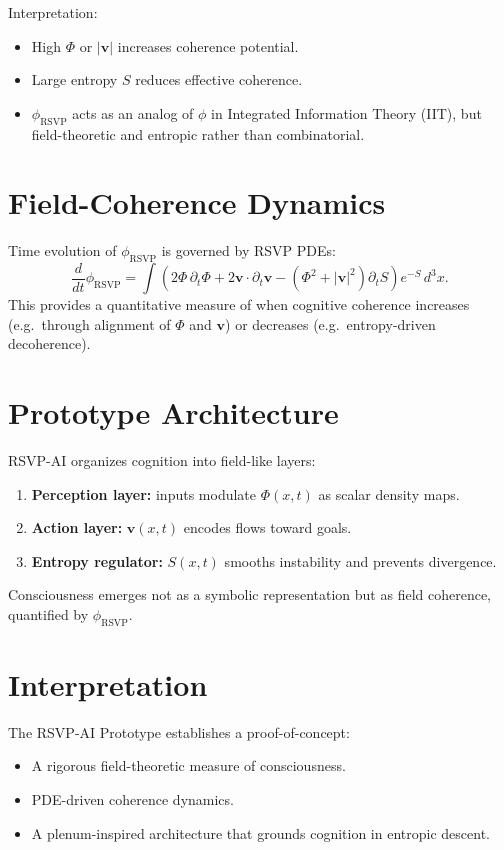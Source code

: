 \documentclass[12pt]{report}
\begin{document}
Interpretation:
\begin{itemize}
    \item High $\Phi$ or $|\mathbf{v}|$ increases coherence potential.  
    \item Large entropy $S$ reduces effective coherence.  
    \item $\phi_{\text{RSVP}}$ acts as an analog of $\phi$ in Integrated Information Theory (IIT), but field-theoretic and entropic rather than combinatorial.  
\end{itemize}

\section{Field-Coherence Dynamics}

Time evolution of $\phi_{\text{RSVP}}$ is governed by RSVP PDEs:
\[
\frac{d}{dt} \phi_{\text{RSVP}} = 
\int \left( 2\Phi \, \partial_t \Phi + 2\mathbf{v}\cdot \partial_t \mathbf{v} - (\Phi^2+|\mathbf{v}|^2)\partial_t S \right) e^{-S} \, d^3x.
\]
This provides a quantitative measure of when cognitive coherence increases (e.g.\ through alignment of $\Phi$ and $\mathbf{v}$) or decreases (e.g.\ entropy-driven decoherence).

\section{Prototype Architecture}

RSVP-AI organizes cognition into field-like layers:
\begin{enumerate}
    \item \textbf{Perception layer:} inputs modulate $\Phi(x,t)$ as scalar density maps.  
    \item \textbf{Action layer:} $\mathbf{v}(x,t)$ encodes flows toward goals.  
    \item \textbf{Entropy regulator:} $S(x,t)$ smooths instability and prevents divergence.  
\end{enumerate}
Consciousness emerges not as a symbolic representation but as field coherence, quantified by $\phi_{\text{RSVP}}$.

\section{Interpretation}

The RSVP-AI Prototype establishes a proof-of-concept:
\begin{itemize}
    \item A rigorous field-theoretic measure of consciousness.  
    \item PDE-driven coherence dynamics.  
    \item A plenum-inspired architecture that grounds cognition in entropic descent.  
\end{itemize}
\end{document}
